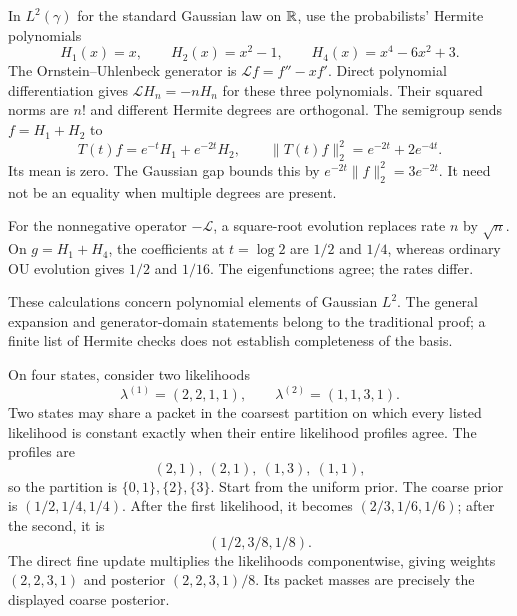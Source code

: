 In $L^2(\gamma)$ for the standard Gaussian law on $\RR$, use the probabilists' Hermite polynomials
\[
H_1(x)=x,\qquad H_2(x)=x^2-1,\qquad
H_4(x)=x^4-6x^2+3.
\]
The Ornstein--Uhlenbeck generator is $\mathcal Lf=f''-xf'$. Direct polynomial differentiation gives $\mathcal LH_n=-nH_n$ for these three polynomials. Their squared norms are $n!$ and different Hermite degrees are orthogonal.
The semigroup sends $f=H_1+H_2$ to
\[
T(t)f=e^{-t}H_1+e^{-2t}H_2,\qquad
\|T(t)f\|_2^2=e^{-2t}+2e^{-4t}.
\]
Its mean is zero. The Gaussian gap bounds this by $e^{-2t}\|f\|_2^2=3e^{-2t}$. It need not be an equality when multiple degrees are present.

For the nonnegative operator $-\mathcal L$, a square-root evolution replaces rate $n$ by $\sqrt n$. On $g=H_1+H_4$, the coefficients at $t=\log2$ are $1/2$ and $1/4$, whereas ordinary OU evolution gives $1/2$ and $1/16$. The eigenfunctions agree; the rates differ.

These calculations concern polynomial elements of Gaussian $L^2$. The general expansion and generator-domain statements belong to the traditional proof; a finite list of Hermite checks does not establish completeness of the basis.

On four states, consider two likelihoods
\[
\lambda^{(1)}=(2,2,1,1),\qquad
\lambda^{(2)}=(1,1,3,1).
\]
Two states may share a packet in the coarsest partition on which every listed likelihood is constant exactly when their entire likelihood profiles agree. The profiles are
\[
(2,1),\ (2,1),\ (1,3),\ (1,1),
\]
so the partition is $\{0,1\},\{2\},\{3\}$.
Start from the uniform prior. The coarse prior is $(1/2,1/4,1/4)$. After the first likelihood, it becomes $(2/3,1/6,1/6)$; after the second, it is
\[
(1/2,3/8,1/8).
\]
The direct fine update multiplies the likelihoods componentwise, giving weights $(2,2,3,1)$ and posterior $(2,2,3,1)/8$. Its packet masses are precisely the displayed coarse posterior.


